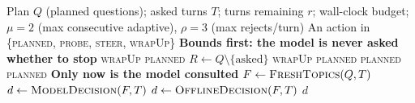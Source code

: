 %

\begin{algorithm}[t]
\caption{Adaptive interview turn selection}
\label{alg:adaptive}
\begin{algorithmic}[1]
\Require Plan $Q$ (planned questions); asked turns $T$;
         turns remaining $r$; wall-clock budget;
         $\mu = 2$ (max consecutive adaptive), $\rho = 3$ (max rejects/turn)
\Ensure  An action in \{\textsc{planned}, \textsc{probe}, \textsc{steer},
         \textsc{wrapUp}\}
\Statex
\Statex \textbf{Bounds first: the model is never asked whether to stop}
    \State \Return \textsc{wrapUp}
\EndIf
{}
    \State \Return \textsc{planned} 
\EndIf
\State $R \gets Q \setminus \{\text{asked}\}$ 
    \State \Return \textsc{wrapUp}
\EndIf
{}
    \State \Return \textsc{planned}
\EndIf
{}
    \State \Return \textsc{planned} 
\EndIf
{}
    \State \Return \textsc{planned}
\EndIf
\Statex
\Statex \textbf{Only now is the model consulted}
\State $F \gets \textsc{FreshTopics}(Q, T)$
\State $d \gets \textsc{ModelDecision}(F, T)$
    \State $d \gets \textsc{OfflineDecision}(F, T)$
\EndIf
\State \Return $d$
\end{algorithmic}
\end{algorithm}

